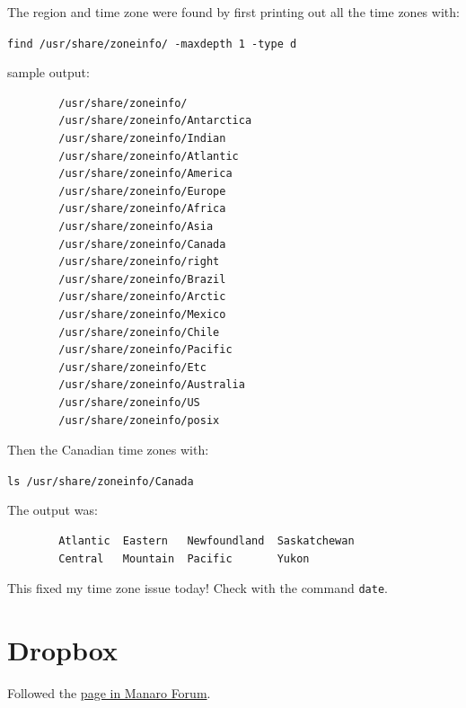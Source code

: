 \documentclass[]{scrartcl}
\begin{document}
	The region and time zone were found by first printing out all the time zones with:
	
	\verb|find /usr/share/zoneinfo/ -maxdepth 1 -type d|
	
	sample output:
	
	\begin{verbatim}
		/usr/share/zoneinfo/
		/usr/share/zoneinfo/Antarctica
		/usr/share/zoneinfo/Indian
		/usr/share/zoneinfo/Atlantic
		/usr/share/zoneinfo/America
		/usr/share/zoneinfo/Europe
		/usr/share/zoneinfo/Africa
		/usr/share/zoneinfo/Asia
		/usr/share/zoneinfo/Canada
		/usr/share/zoneinfo/right
		/usr/share/zoneinfo/Brazil
		/usr/share/zoneinfo/Arctic
		/usr/share/zoneinfo/Mexico
		/usr/share/zoneinfo/Chile
		/usr/share/zoneinfo/Pacific
		/usr/share/zoneinfo/Etc
		/usr/share/zoneinfo/Australia
		/usr/share/zoneinfo/US
		/usr/share/zoneinfo/posix
	\end{verbatim}
	
	Then the Canadian time zones with:
	
	\verb|ls /usr/share/zoneinfo/Canada|
	
	The output was:
	
	\begin{verbatim}
		Atlantic  Eastern   Newfoundland  Saskatchewan
		Central   Mountain  Pacific       Yukon
	\end{verbatim}
	
	This fixed my time zone issue today! Check with the command \texttt{date}.
	
	\section{Dropbox}
	
	Followed the \href{https://forum.manjaro.org/t/dropbox-install-new-to-manjaro/9576/5}{page in Manaro Forum}.
	
\end{document}
